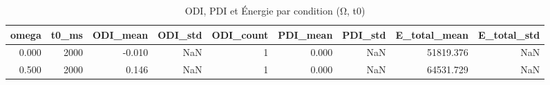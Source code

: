 \begin{table}[h]
\centering
\caption{ODI, PDI et Énergie par condition (Ω, t0)}
\begin{tabular}{rrrrrrrrr}
\toprule
omega & t0_ms & ODI_mean & ODI_std & ODI_count & PDI_mean & PDI_std & E_total_mean & E_total_std \\
\midrule
0.000 & 2000 & -0.010 & NaN & 1 & 0.000 & NaN & 51819.376 & NaN \\
0.500 & 2000 & 0.146 & NaN & 1 & 0.000 & NaN & 64531.729 & NaN \\
\bottomrule
\end{tabular}
\end{table}
